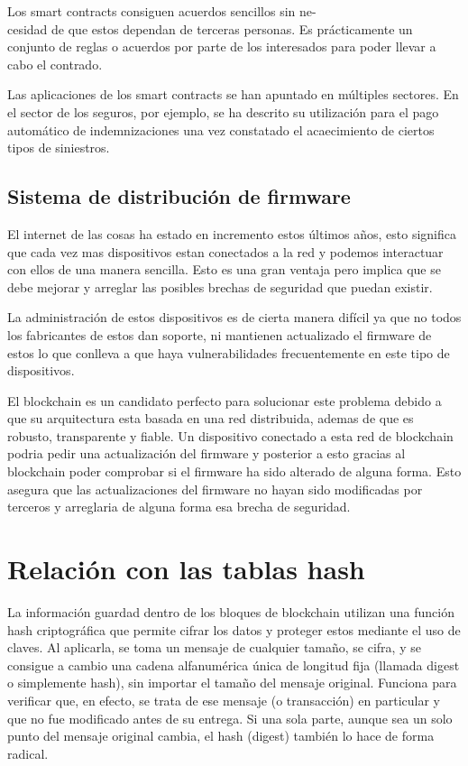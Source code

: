 \documentclass[conference]{IEEEtran}
\begin{document}
Los smart contracts consiguen acuerdos sencillos sin ne-\\cesidad de que estos dependan de terceras personas. Es prácticamente un conjunto de reglas o acuerdos por parte de los interesados para poder llevar a cabo el contrado.

Las aplicaciones de los smart contracts se han apuntado en múltiples sectores. En el sector de los seguros, por ejemplo, se ha descrito su utilización para el pago automático de indemnizaciones una vez constatado el acaecimiento de ciertos tipos de siniestros.

\subsection{Sistema de distribución de firmware}

El internet de las cosas ha estado en incremento estos últimos años, esto significa que cada vez mas dispositivos estan conectados a la red y podemos interactuar con ellos de una manera sencilla. Esto es una gran ventaja pero implica que se debe mejorar y arreglar las posibles brechas de seguridad que puedan existir.

La administración de estos dispositivos es de cierta manera difícil ya que no todos los fabricantes de estos dan soporte, ni mantienen actualizado el firmware de estos lo que conlleva a que haya vulnerabilidades frecuentemente en este tipo de dispositivos.

El blockchain es un candidato perfecto para solucionar este problema debido a que su arquitectura esta basada en una red distribuida, ademas de que es robusto, transparente y fiable. Un dispositivo conectado a esta red de blockchain podria pedir una actualización del firmware y posterior a esto gracias al blockchain poder comprobar si el firmware ha sido alterado de alguna forma. Esto asegura que las actualizaciones del firmware no hayan sido modificadas por terceros y arreglaria de alguna forma esa brecha de seguridad.

\section{Relación con las tablas hash}

La información guardad dentro de los bloques de blockchain utilizan una función hash criptográfica que permite cifrar los datos y proteger estos mediante el uso de claves. Al aplicarla, se toma un mensaje de cualquier tamaño, se cifra, y se consigue a cambio una cadena alfanumérica única de longitud fija (llamada digest o simplemente hash), sin importar el tamaño del mensaje original. Funciona para verificar que, en efecto, se trata de ese mensaje (o transacción) en particular y que no fue modificado antes de su entrega. Si una sola parte, aunque sea un solo punto del mensaje original cambia, el hash (digest) también lo hace de forma radical.
\end{document}
